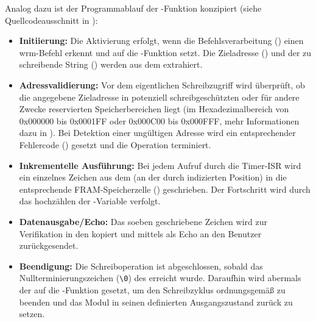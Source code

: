 Analog dazu ist der Programmablauf der -Funktion konzipiert (siehe Quellcodeausschnitt in ):
\begin{itemize}
	\item \textbf{Initiierung:} Die Aktivierung erfolgt, wenn die Befehlsverarbeitung () einen \grqq wrm\grqq-Befehl erkennt und  auf die -Funktion setzt. Die Zieladresse () und der zu schreibende String () werden aus dem  extrahiert.
	
	\item \textbf{Adressvalidierung:} Vor dem eigentlichen Schreibzugriff wird \"uberpr\"uft, ob die angegebene Zieladresse in potenziell schreibgesch\"utzten oder f\"ur andere Zwecke reservierten Speicherbereichen liegt (\zB im Hexadezimalbereich von 0x000000 bis 0x0001FF oder 0x000C00 bis 0x000FFF, mehr Informationen dazu in ). Bei Detektion einer ung\"ultigen Adresse wird ein entsprechender Fehlercode () gesetzt und die Operation terminiert.
	
	\item \textbf{Inkrementelle Ausf\"uhrung:} Bei jedem Aufruf durch die Timer-ISR wird ein einzelnes Zeichen aus dem  (an der durch  indizierten Position) in die entsprechende FRAM-Speicherzelle () geschrieben. Der Fortschritt wird durch das hochz\"ahlen der -Variable verfolgt.
	
	\item \textbf{Datenausgabe/Echo:} Das soeben geschriebene Zeichen wird zur Verifikation in den  kopiert und mittels  als Echo an den Benutzer zur\"uckgesendet.
	
	\item \textbf{Beendigung:} Die Schreiboperation ist abgeschlossen, sobald das Nullterminierungszeichen (\grq \texttt{\textbackslash 0}\grq) des  erreicht wurde. Daraufhin wird abermals der  auf die -Funktion gesetzt, um den Schreibzyklus ordnungsgem\"a{\ss} zu beenden und das Modul in seinen definierten Ausgangszustand zur\"uck zu setzen.
\end{itemize}


